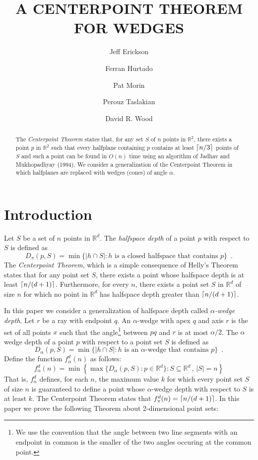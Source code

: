 \documentclass[lotsofwhite]{patmorin}
\title{\MakeUppercase{A Centerpoint Theorem for Wedges}}
\author{Jeff Erickson \and
	Ferran Hurtado \and
	Pat Morin \and
	Perouz Taslakian \and
	David R. Wood}
\date{}
\begin{document}
\maketitle

\begin{abstract}
The \emph{Centerpoint Theorem} states that, for any set $S$ of $n$
points in $\mathbb{R}^2$, there exists a point $p$ in $\mathbb{R}^2$
such that every halfplane containing $p$ contains at least $\left\lceil n/3 \right\rceil$
points of $S$ and such a point can be found in $O(n)$ time using an
algorithm of Jadhav and Mukhopadhyay (1994).  We consider a
generalization of the Centerpoint Theorem in which halfplanes are
replaced with wedges (cones) of angle $\alpha$.
\end{abstract}

\section{Introduction}

Let $S$ be a set of $n$ points in $\mathbb{R}^d$.  The \emph{halfspace
depth} \cite{t75} of a point $p$ with respect to $S$ is defined as
\[
D_\pi(p,S) = 
   \min\{|h\cap S| : \mbox{$h$ is a closed halfspace that contains $p$} \}
    \enspace .
\]
The \emph{Centerpoint Theorem}, which is a simple consequence of
Helly's Theorem \cite{e93} states that for any point set $S$, there
exists a point whose halfspace depth is at least $\left\lceil n/(d+1) \right\rceil$.
Furthermore, for every $n$, there exists a point set $S$ in
$\mathbb{R}^d$ of size $n$ for which no point in $\mathbb{R}^d$ has
halfspace depth greater than $\left\lceil n/(d+1) \right\rceil$. 

In this paper we consider a generalization of halfspace depth called
\emph{$\alpha$-wedge depth}. Let $r$ be a ray with endpoint $q$.  An
$\alpha$-wedge with apex $q$ and axis $r$ is the set of all points $x$
such that the angle\footnote{We use the convention that the angle
between two line segments with an endpoint in common is the smaller of
the two angles occuring at the common point.} between $pq$ and $r$ is
at most $\alpha/2$.  The $\alpha$ wedge depth of a point $p$ with
respect to a point set $S$ is defined as
\[
D_\alpha(p,S) =
   \min\{|h\cap S| : \mbox{$h$ is an $\alpha$-wedge that contains $p$} \} 
   \enspace .
\]
Define the function $f^d_\alpha(n)$ as follows:
\[
   f^d_\alpha(n) = \min\left\{\max\{D_\alpha(p,S):p\in
\mathbb{R}^d\}: S\subseteq\mathbb{R}^d\, ,\, |S|=n\right\}
\]
That is, $f^d_\alpha$ defines, for each $n$, the maximum value $k$ for
which every point set $S$ of size $n$ is guaranteed to define a point
whose $\alpha$-wedge depth with respect to $S$ is at least $k$.  The
Centerpoint Theorem states that $f^d_\pi(n) = \left\lceil n/(d+1) \right\rceil$.  In this paper
we prove the following Theorem about 2-dimensional point sets:
\end{document}

